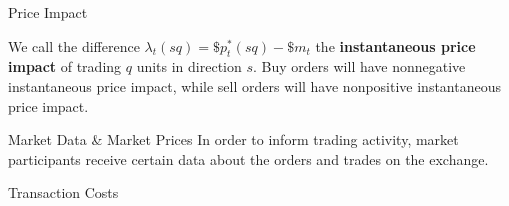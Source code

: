 \documentclass{beamer}
\begin{document}
\begin{frame}{Price Impact}

	We call the difference $\lambda_t(sq) = \$p^*_t(sq) - \$m_t$ the \textbf{instantaneous price impact} of trading $q$ units in direction $s$. Buy orders will have nonnegative instantaneous price impact, while sell orders will have nonpositive instantaneous price impact.%

\end{frame}

\begin{frame}{Market Data \& Market Prices}
	In order to inform trading activity, market participants receive certain data about the orders and trades on the exchange.




\end{frame}

\begin{frame}{Transaction Costs}



\end{frame}
\end{document}
